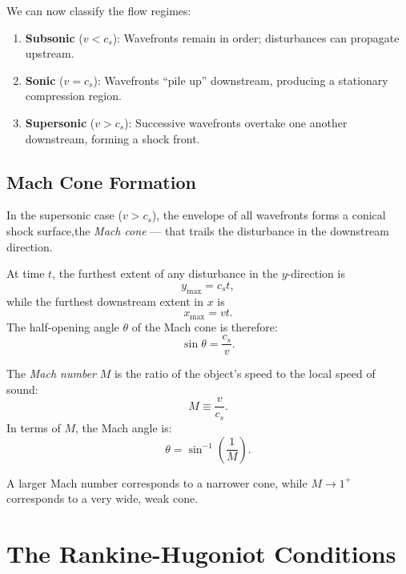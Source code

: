 We can now classify the flow regimes:
\begin{enumerate}
    \item \textbf{Subsonic} ($v < c_s$): Wavefronts remain in order; disturbances can propagate upstream.
    \item \textbf{Sonic} ($v = c_s$): Wavefronts ``pile up'' downstream, producing a stationary compression region.
    \item \textbf{Supersonic} ($v > c_s$): Successive wavefronts overtake one another downstream, forming a shock front.
\end{enumerate}


\subsection{Mach Cone Formation}

In the supersonic case ($v > c_s$), the envelope of all wavefronts forms a conical shock surface,the \emph{Mach cone} --- that trails the disturbance in the downstream direction.

At time $t$, the furthest extent of any disturbance in the $y$-direction is
\[
y_{\max} = c_s t ,
\]
while the furthest downstream extent in $x$ is
\[
x_{\max} = v t .
\]
The half-opening angle $\theta$ of the Mach cone is therefore:
\begin{equation}
    \sin\theta = \frac{c_s}{v} .
\end{equation}

\begin{definition}
The \emph{Mach number} $M$ is the ratio of the object's speed to the local speed of sound:
\[
M \equiv \frac{v}{c_s} .
\]
In terms of $M$, the Mach angle is:
\[
\theta = \sin^{-1} \left( \frac{1}{M} \right) .
\]
\end{definition}

A larger Mach number corresponds to a narrower cone, while $M \to 1^+$ corresponds to a very wide, weak cone.

\section{The Rankine-Hugoniot Conditions}


